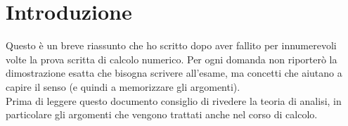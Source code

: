 \section{Introduzione}
Questo è un breve riassunto che ho scritto dopo aver fallito per innumerevoli volte la prova scritta di calcolo numerico. Per ogni domanda non riporterò la dimostrazione esatta che bisogna scrivere all'esame, ma concetti che aiutano a capire il senso (e quindi a memorizzare gli argomenti).\\
Prima di leggere questo documento consiglio di rivedere la teoria di analisi, in particolare gli argomenti che vengono trattati anche nel corso di calcolo.